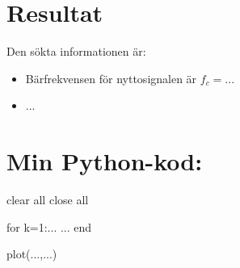 \documentclass[10pt,twocolumn]{article}
\begin{document}
\section{Resultat}

Den sökta informationen är:
\begin{itemize}
\item Bärfrekvensen för nyttosignalen är $f_c=...$
\item ...
\end{itemize}

\clearpage

\section*{Min Python-kod:}
\begin{spverbatim}
clear all
close all

for k=1:...
  ...
end

plot(...,...)
\end{spverbatim}
\end{document}
